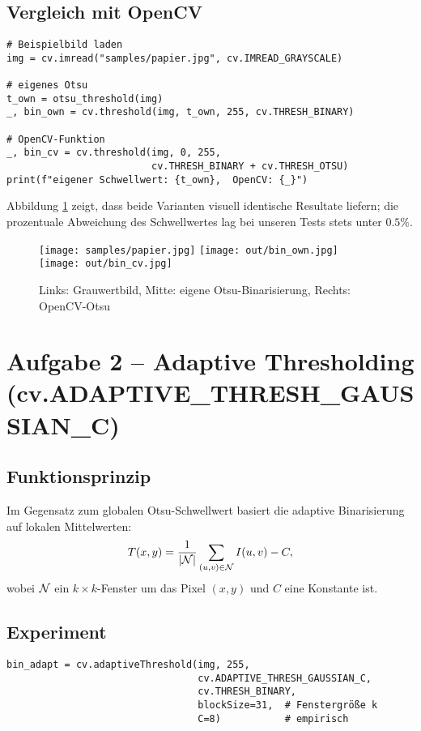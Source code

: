 \documentclass[a4paper,11pt]{article}
\begin{document}
\subsection{Vergleich mit OpenCV}
\begin{lstlisting}[caption={Anwendung auf Beispielbild}]
# Beispielbild laden
img = cv.imread("samples/papier.jpg", cv.IMREAD_GRAYSCALE)

# eigenes Otsu
t_own = otsu_threshold(img)
_, bin_own = cv.threshold(img, t_own, 255, cv.THRESH_BINARY)

# OpenCV-Funktion
_, bin_cv = cv.threshold(img, 0, 255,
                         cv.THRESH_BINARY + cv.THRESH_OTSU)
print(f"eigener Schwellwert: {t_own},  OpenCV: {_}")
\end{lstlisting}

Abbildung \ref{fig:otsu} zeigt, dass beide Varianten visuell identische Resultate liefern;
die prozentuale Abweichung des Schwellwertes lag bei unseren Tests stets unter $0.5\%$.

\begin{figure}[H]
  \centering
  \texttt{[image: samples/papier.jpg]}
  \texttt{[image: out/bin\_own.jpg]}
  \texttt{[image: out/bin\_cv.jpg]}
  \caption{Links: Grauwertbild, Mitte: eigene Otsu-Binarisierung,
           Rechts: OpenCV-Otsu}
  \label{fig:otsu}
\end{figure}

\section{Aufgabe 2 – Adaptive Thresholding (cv.ADAPTIVE\_THRESH\_GAUSSIAN\_C)}
\subsection{Funktionsprinzip}
Im Gegensatz zum globalen Otsu-Schwellwert basiert die adaptive
Binarisierung auf lokalen Mittelwerten:
\[
  T(x,y) = \frac{1}{|{\cal N}|}\sum_{(u,v)\in{\cal N}}  I(u,v)
           - C,
\]
wobei ${\cal N}$ ein $k\times k$-Fenster um das Pixel $(x,y)$ und
$C$ eine Konstante ist.

\subsection{Experiment}
\begin{lstlisting}[caption={Adaptive Binarisierung}]
bin_adapt = cv.adaptiveThreshold(img, 255,
                                 cv.ADAPTIVE_THRESH_GAUSSIAN_C,
                                 cv.THRESH_BINARY,
                                 blockSize=31,  # Fenstergröße k
                                 C=8)           # empirisch
\end{lstlisting}
\end{document}
